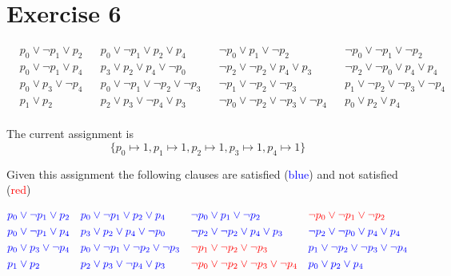 \documentclass[11pt,a4paper]{article}
\begin{document}
\section*{Exercise 6}


\begin{align*}
& p_0 \lor \neg p_1 \lor p_2 & & p_0 \lor \neg p_1 \lor p_2 \lor p_4 & & \neg p_0 \lor p_1 \lor \neg p_2 & & \neg p_0 \lor \neg p_1 \lor \neg p_2 \\
& p_0 \lor \neg p_1 \lor p_4 && p_3 \lor p_2 \lor p_4 \lor \neg p_0 && \neg p_2 \lor \neg p_2 \lor p_4 \lor p_3 && \neg p_2 \lor \neg p_0 \lor p_4 \lor p_4 \\
& p_0 \lor p_3 \lor \neg p_4 && p_0 \lor \neg p_1 \lor \neg p_2 \lor \neg p_3 && \neg p_1 \lor \neg p_2 \lor \neg p_3 && p_1 \lor \neg p_2 \lor \neg p_3 \lor \neg p_4 \\
& p_1 \lor p_2 && p_2 \lor p_3 \lor \neg p_4 \lor p_3 && \neg p_0 \lor \neg p_2 \lor \neg p_3 \lor \neg p_4 && p_0 \lor p_2 \lor p_4 \\
\end{align*}

The current assignment is 
\begin{equation*}
\{p_0 \mapsto 1, p_1 \mapsto 1, p_2 \mapsto 1, p_3 \mapsto 1, p_4 \mapsto 1\}
\end{equation*}

Given this assignment the following clauses are satisfied (\textcolor{blue}{blue}) and not satisfied (\textcolor{red}{red}) 

\begin{align*}
&\textcolor{blue}{p_0 \lor \neg p_1 \lor p_2} & & \textcolor{blue}{p_0 \lor \neg p_1 \lor p_2 \lor p_4} & & \textcolor{blue}{\neg p_0 \lor p_1 \lor \neg p_2} & & \textcolor{red}{\neg p_0 \lor \neg p_1 \lor \neg p_2} \\
&\textcolor{blue}{ p_0 \lor \neg p_1 \lor p_4} && \textcolor{blue}{p_3 \lor p_2 \lor p_4 \lor \neg p_0} && \textcolor{blue}{\neg p_2 \lor \neg p_2 \lor p_4 \lor p_3} && \textcolor{blue}{\neg p_2 \lor \neg p_0 \lor p_4 \lor p_4} \\
& \textcolor{blue}{p_0 \lor p_3 \lor \neg p_4} && \textcolor{blue}{p_0 \lor \neg p_1 \lor \neg p_2 \lor \neg p_3} && \textcolor{red}{\neg p_1 \lor \neg p_2 \lor \neg p_3} && \textcolor{blue}{p_1 \lor \neg p_2 \lor \neg p_3 \lor \neg p_4} \\
& \textcolor{blue}{p_1 \lor p_2} && \textcolor{blue}{p_2 \lor p_3 \lor \neg p_4 \lor p_3} && \textcolor{red}{\neg p_0 \lor \neg p_2 \lor \neg p_3 \lor \neg p_4} && \textcolor{blue}{p_0 \lor p_2 \lor p_4} \\
\end{align*}
\end{document}
